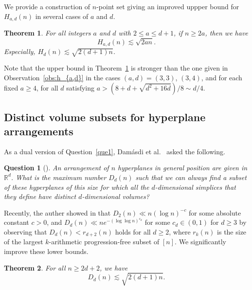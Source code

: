 \documentclass[a4paper,oneside,10pt]{amsart}
\newtheorem{thm}{Theorem}
\newtheorem{que}{Question}
\begin{document}
We provide a construction of $n$-point set giving an improved uppper bound for $H_{a,d} (n)$ in several cases of $a$ and $d$.

\begin{thm} \label{thm:h_{a,d}}
For all integers $a$ and $d$ with $2 \leq a \leq d + 1$, 
if $n \geq 2a$, then
we have
$$
H_{a,d}(n) \lesssim \sqrt{2an}.
$$
Especially, $H_d (n) \lesssim \sqrt{2(d+1)n}$.
\end{thm}

Note that the upper bound in Theorem~\ref{thm:h_{a,d}} is stronger than the one given in Observation~\ref{obs:h_{a,d}} in the cases \((a,d)=(3,3)\), \((3,4)\), and for each fixed \(a\ge 4\), for all \(d\) satisfying
$
a > (8+d+\sqrt{d^2+16d})/8 \sim d/4.
$

\subsection{Distinct volume subsets for hyperplane arrangements}
As a dual version of Question~\ref{que1}, 
Dam\'{a}sdi et al.~\cite{damasdi2020triangle} asked the following.

\begin{que}[\cite{damasdi2020triangle}]
An arrangement of $n$ hyperplanes in general position are given in $\mathbb{R}^d$. 
What is the maximum number $D_d (n)$ such that we can always find a subset of these hyperplanes of this size for which all the $d$-dimensional simplices that they define have distinct $d$-dimensional volumes?
\end{que}

Recently, the auther showed in \cite{furukawa2025simplex} that 
$D_2 (n) \ll n(\log n)^{-c}$ for some absolute constant $c > 0$,
and $D_d (n) \ll n e^{-(\log \log n)^{c_d}}$ for some $c_d \in (0,1)$ for $d \geq 3$
by observing that $D_d (n) < r_{d+2} (n)$ holds for all $d \geq 2$, where $r_k (n)$ is the size of the largest $k$-arithmetic progression-free subset of $[n]$.
We significantly improve these lower bounds.

\begin{thm} \label{thm:D_d}
For all $n \geq 2d +2$, we have 
$$
D_d (n) \lesssim \sqrt{2(d+1)n}.
$$
\end{thm}
\end{document}
